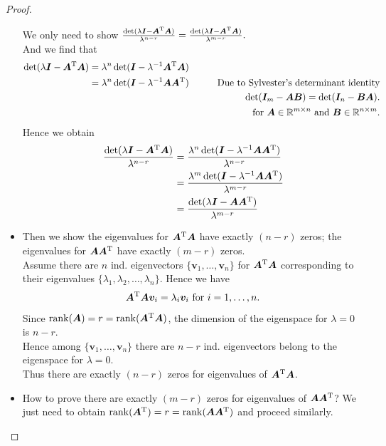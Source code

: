 \begin{proof}
\begin{itemize}
We only need to show $\frac{\det(\lambda\bm I-\bm A^{\mathrm T}\bm A)}{\lambda^{n-r}}=\frac{\det(\lambda\bm I-\bm A^{\mathrm T}\bm A)}{\lambda^{m-r}}.$\\
And we find that 
\begin{align*}
\det(\lambda\bm I-\bm A^{\mathrm T}\bm A)&
=\lambda^n\det(\bm I-\lambda^{-1}\bm A^{\mathrm T}\bm A)\\
&=\lambda^n\det(\bm I-\lambda^{-1}\bm A\bm A^{\mathrm T})\qquad&\text{Due to Sylvester's determinant identity}\\
&&\text{$\det(\bm I_m-\bm{AB})=\det(\bm I_n-\bm{BA}).$}\\
&&\text{for $\bm A\in\mathbb{R}^{m\times n}$ and $\bm B\in\mathbb{R}^{n\times m}$.}
\end{align*}
Hence we obtain
\begin{align*}
\frac{\det(\lambda\bm I-\bm A^{\mathrm T}\bm A)}{\lambda^{n-r}}&=\frac{\lambda^n\det(\bm I-\lambda^{-1}\bm A\bm A^{\mathrm T})}{\lambda^{n-r}}\\
&=\frac{\lambda^m\det(\bm I-\lambda^{-1}\bm A\bm A^{\mathrm T})}{\lambda^{m-r}}\\
&=\frac{\det(\lambda\bm I-\bm A\bm A^{\mathrm T})}{\lambda^{m-r}}
\end{align*}
\item
Then we show the eigenvalues for $\bm A^{\mathrm T}\bm A$ have exactly $(n-r)$ zeros; the eigenvalues for $\bm A\bm A^{\mathrm T}$ have exactly $(m-r)$ zeros.\\
Assume there are $n$ ind. eigenvectors $\{\bm v_1,\dots,\bm v_n\}$ for $\bm A^{\mathrm T}\bm A$ corresponding to their eigenvalues $\{\lambda_1,\lambda_2,\dots,\lambda_n\}$. Hence we have
\[
\bm A^{\mathrm T}\bm A\bm v_i=\lambda_i\bm v_i\text{ for }i=1,\dots,n.
\]
Since $\operatorname{rank}(\bm A)=r=\operatorname{rank}(\bm A^{\mathrm T}\bm A)$, the dimension of the eigenspace for $\lambda=0$ is $n-r$.\\
Hence among $\{\bm v_1,\dots,\bm v_n\}$ there are $n-r$ ind. eigenvectors belong to the eigenspace for $\lambda=0$.\\
Thus there are exactly $(n-r)$ zeros for eigenvalues of $\bm A^{\mathrm T}\bm A$.
\item
How to prove there are exactly $(m-r)$ zeros for eigenvalues of $\bm A\bm A^{\mathrm T}$? We just need to obtain $\operatorname{rank}(\bm A^{\mathrm T})=r=\operatorname{rank}(\bm A\bm A^{\mathrm T})$ and proceed similarly.
\end{itemize}
\end{proof}
\newpage
